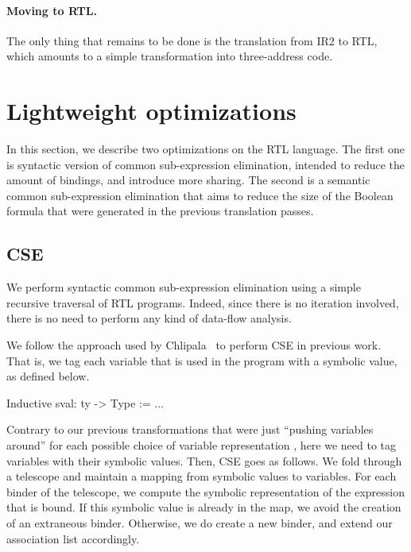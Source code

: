 \documentclass[preprint]{sigplanconf}
\begin{document}

\paragraph{Moving to RTL.} The only thing that remains to be done is
the translation from IR2 to RTL, which amounts to a simple
transformation into three-address code. 

\section{Lightweight optimizations}
In this section, we describe two optimizations on the RTL
language. The first one is syntactic version of common sub-expression
elimination, intended to reduce the amount of bindings, and introduce
more sharing. The second is a semantic common sub-expression
elimination that aims to reduce the size of the Boolean formula that
were generated in the previous translation passes. 

\subsection{CSE}
We perform syntactic common sub-expression elimination using a simple
recursive traversal of RTL programs. Indeed, since there is no
iteration involved, there is no need to perform any kind of data-flow
analysis. 

We follow the approach used by
Chlipala~\cite{DBLP:conf/popl/Chlipala10} to perform CSE in previous
work. That is, we tag each variable that is used in the program with a
symbolic value, as defined below.
\begin{coq}
Inductive sval: ty -> Type := ...  
\end{coq}

Contrary to our previous transformations that were just ``pushing
variables around'' for each possible choice of variable representation
, here we need to tag variables with their symbolic values. 
% 
%
Then, CSE goes as follows. We fold through a telescope and maintain a
mapping from symbolic values to variables. For each binder of the
telescope, we compute the symbolic representation of the expression
that is bound. 
%
If this symbolic value is already in the map, we avoid the creation of
an extraneous binder. Otherwise, we do create a new binder, and extend
our association list accordingly. 
 
\end{document}
